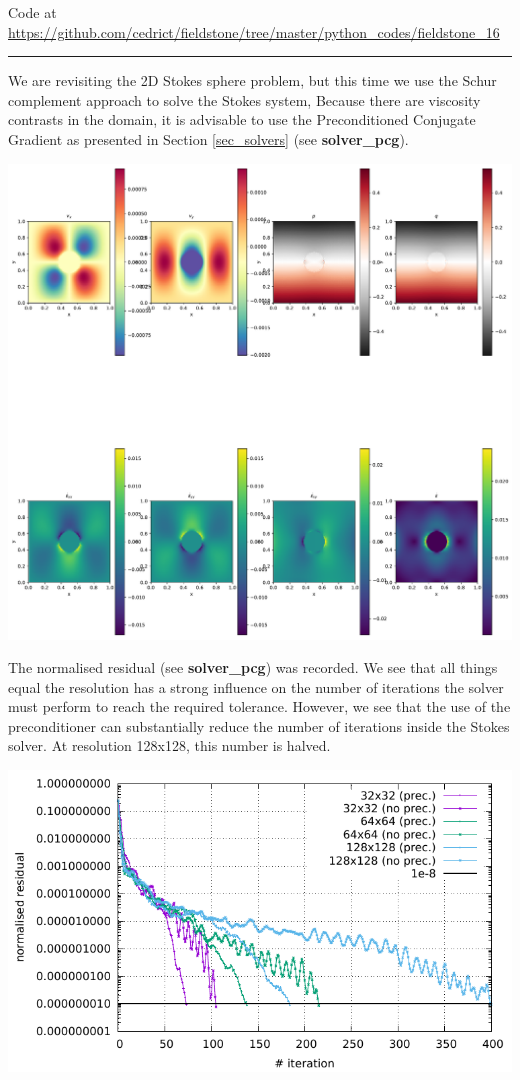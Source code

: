 

\begin{center}
Code at \url{https://github.com/cedrict/fieldstone/tree/master/python_codes/fieldstone_16}
\end{center}

\par\noindent\rule{\textwidth}{0.4pt}


We are revisiting the 2D Stokes sphere problem, but this time 
we use the Schur complement approach to solve the 
Stokes system, 
Because there are viscosity contrasts in the domain, it is advisable 
to use the Preconditioned Conjugate Gradient 
as presented in Section \ref{sec_solvers} (see {\bf solver\_pcg}).

\includegraphics[width=16cm]{python_codes/fieldstone_16/solution.pdf}

The normalised residual (see {\bf solver\_pcg}) was recorded. We see that 
all things equal the resolution has a strong influence on the number of iterations the solver must
perform to reach the required tolerance. 
However, we see that the use of the preconditioner can substantially reduce the number 
of iterations inside the Stokes solver. At resolution 128x128, this number is halved. 

\includegraphics[width=16cm]{python_codes/fieldstone_16/images/residual.pdf}
 

